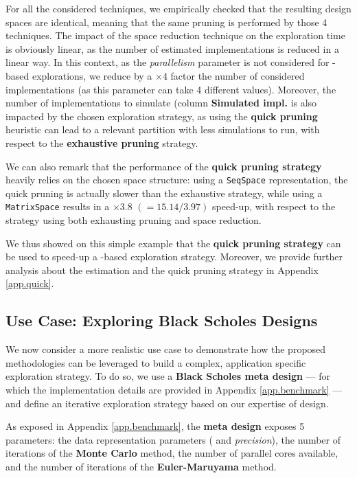             For all the considered techniques, we empirically checked that the resulting design spaces are identical, meaning that the same pruning is performed by those 4 techniques.
            The impact of the space reduction technique on the exploration time is obviously linear, as the number of estimated implementations is reduced in a linear way.
            In this context, as the {\it parallelism} parameter is not considered for -based explorations, we reduce by a $\times 4$ factor the number of considered implementations (as this parameter can take 4 different values).
            Moreover, the number of implementations to simulate (column {\bf Simulated impl.} is also impacted by the chosen exploration strategy, as using the {\bf quick pruning} heuristic can lead to a relevant partition with less simulations to run, with respect to the {\bf exhaustive pruning} strategy.

            We can also remark that the performance of the {\bf quick pruning strategy} heavily relies on the chosen space structure: using a \lstinline{SeqSpace} representation, the quick pruning is actually slower than the exhaustive strategy, while using a \lstinline{MatrixSpace} results in a $\times 3.8$ $(= 15.14 / 3.97)$ speed-up, with respect to the strategy using both exhausting pruning and space reduction.

            We thus showed on this simple example that the {\bf quick pruning strategy} can be used to speed-up a -based exploration strategy.
            Moreover, we provide further analysis about the  estimation and the quick pruning strategy in Appendix \ref{app.quick}.

\clearpage
        \subsection{Use Case: Exploring Black Scholes Designs}
        \label{ch.expe:sec.strategies:ssec.bs}
            We now consider a more realistic use case to demonstrate how the proposed methodologies can be leveraged to build a complex, application specific exploration strategy.
            To do so, we use a {\bf Black Scholes meta design} --- for which the implementation details are provided in Appendix \ref{app.benchmark} --- and define an iterative exploration strategy based on our expertise of  design.

            As exposed in Appendix \ref{app.benchmark}, the {\bf meta design} exposes 5 parameters: the data representation parameters ( and {\it precision}), the number of iterations of the {\bf Monte Carlo} method, the number of parallel cores available, and the number of iterations of the {\bf Euler-Maruyama} method.

